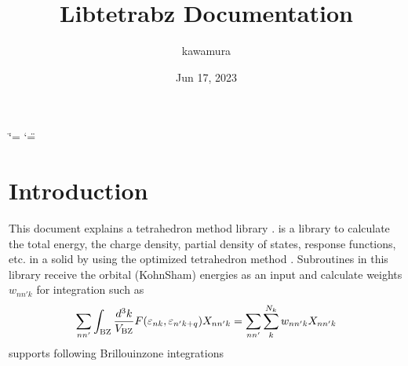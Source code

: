 \documentclass[letterpaper,10pt,pdftex,openany,english]{sphinxmanual}
\title{Libtetrabz Documentation}
\date{Jun 17, 2023}
\author{kawamura}
\begin{document}
\ifdefined\shorthandoff
  \ifnum\catcode`\=\string=\active\shorthandoff{=}\fi
  \ifnum\catcode`\"=\active{}\fi
\fi

\pagestyle{empty}
\sphinxmaketitle
\pagestyle{plain}
\sphinxtableofcontents
\pagestyle{normal}
\label{\detokenize{index::doc}}


\sphinxstepscope


\chapter{Introduction}
\label{\detokenize{overview:introduction}}\label{\detokenize{overview::doc}}
\sphinxAtStartPar
This document explains a tetrahedron method library .
 is a library to calculate the total energy, the charge
density, partial density of states, response functions, etc. in a solid
by using the optimized tetrahedron method {\hyperref[\detokenize{ref:ref}]{}}.
Subroutines in this library receive the orbital (Kohn\sphinxhyphen{}Sham) energies as an input and
calculate weights \(w_{n n' k}\) for integration such as
\begin{equation*}
\begin{split}\begin{align}
\sum_{n n'}
\int_{\rm BZ} \frac{d^3 k}{V_{\rm BZ}}
F(\varepsilon_{n k}, \varepsilon_{n' k+q})X_{n n' k}
= \sum_{n n'} \sum_{k}^{N_k} w_{n n' k} X_{n n' k}
\end{align}\end{split}
\end{equation*}
\sphinxAtStartPar
{} supports following Brillouin\sphinxhyphen{}zone integrations
\end{document}
